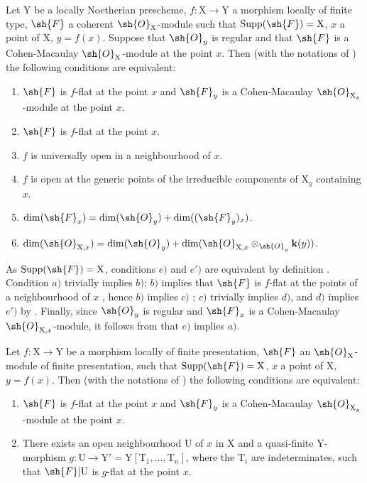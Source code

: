 \begin{proposition}[15.4.2]
\label{IV.15.4.2}
Let $\mathrm{Y}$ be a locally Noetherian prescheme, $f:\mathrm{X}\to\mathrm{Y}$ a morphism locally of finite type, $\sh{F}$ a coherent $\sh{O}_\mathrm{X}$-module such that $\operatorname{Supp}(\sh{F})=\mathrm{X}$, $x$ a point of $\mathrm{X}$, $y=f(x)$.
Suppose that $\sh{O}_y$ is regular and that $\sh{F}$ is a Cohen-Macaulay $\sh{O}_\mathrm{X}$-module at the point $x$.
Then (with the notations of ) the following conditions are equivalent:
\begin{enumerate}[label=\emph{\alph*})]
  \item $\sh{F}$ is $f$-flat at the point $x$ and $\sh{F}_y$ is a Cohen-Macaulay $\sh{O}_{\mathrm{X}_y}$-module at the point $x$.
  \item $\sh{F}$ is $f$-flat at the point $x$.
  \item $f$ is universally open in a neighbourhood of $x$.
  \item $f$ is open at the generic points of the irreducible components of $\mathrm{X}_y$ containing $x$.
  \item $\dim(\sh{F}_x)=\dim(\sh{O}_y)+\dim((\sh{F}_y)_x)$.
  \item[\emph{e}$'$)] $\dim(\sh{O}_{\mathrm{X},x})=\dim(\sh{O}_y)+\dim(\sh{O}_{\mathrm{X},x}\otimes_{\sh{O}_y}\mathbf{k}(y))$.
\end{enumerate}
As $\operatorname{Supp}(\sh{F})=\mathrm{X}$, conditions $e)$ and $e')$ are equivalent by definition .
Condition $a)$ trivially implies $b)$; $b)$ implies that $\sh{F}$ is $f$-flat at the points of a neighbourhood of $x$ , hence $b)$ implies $c)$ ; $c)$ trivially implies $d)$, and $d)$ implies $e')$ by .
Finally, since $\sh{O}_y$ is regular and $\sh{F}_x$ is a Cohen-Macaulay $\sh{O}_{\mathrm{X},x}$-module, it follows from  that $e)$ implies $a)$.
\end{proposition}

\begin{proposition}[15.4.3]
\label{IV.15.4.3}
Let $f:\mathrm{X}\to\mathrm{Y}$ be a morphism locally of finite presentation, $\sh{F}$ an $\sh{O}_\mathrm{X}$-module of finite presentation, such that $\operatorname{Supp}(\sh{F})=\mathrm{X}$, $x$ a point of $\mathrm{X}$, $y=f(x)$.
Then (with the notations of ) the following conditions are equivalent:
\begin{enumerate}[label=\emph{\alph*})]
  \item $\sh{F}$ is $f$-flat at the point $x$ and $\sh{F}_y$ is a Cohen-Macaulay $\sh{O}_{\mathrm{X}_y}$-module at the point $x$.
  \item There exists an open neighbourhood $\mathrm{U}$ of $x$ in $\mathrm{X}$ and a quasi-finite $\mathrm{Y}$-morphism $g:\mathrm{U}\to\mathrm{Y}'=\mathrm{Y}[\mathrm{T}_1,\ldots,\mathrm{T}_n]$, where the $\mathrm{T}_i$ are indeterminates, such that $\sh{F}|\mathrm{U}$ is $g$-flat at the point $x$.
\end{enumerate}
\end{proposition}

